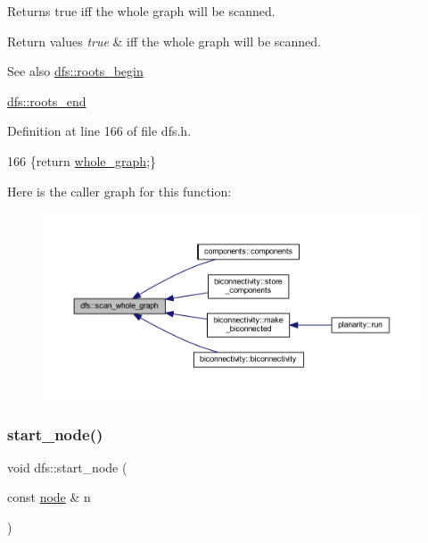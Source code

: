 Returns true iff the whole graph will be scanned. 


\begin{DoxyRetVals}{Return values}
{\em true} & iff the whole graph will be scanned. \\
\hline
\end{DoxyRetVals}
\begin{DoxySeeAlso}{See also}
\mbox{\hyperlink{classdfs_af56fa2b736f0b924dba1257e18ba4b61}{dfs\+::roots\+\_\+begin}} 

\mbox{\hyperlink{classdfs_ae1a61d8c2d8d99059cab410f766ec73f}{dfs\+::roots\+\_\+end}} 
\end{DoxySeeAlso}


Definition at line 166 of file dfs.\+h.


\begin{DoxyCode}
166 \{\textcolor{keywordflow}{return} \mbox{\hyperlink{classdfs_ab8342c80ab208ef0e0d781f0769d0d95}{whole\_graph}};\}
\end{DoxyCode}
Here is the caller graph for this function\+:
\nopagebreak
\begin{figure}[H]
\begin{center}
\leavevmode
\includegraphics[width=350pt]{classdfs_a025ed2d6101a7b9f72578a52b484ef50_icgraph}
\end{center}
\end{figure}
\mbox{\label{classdfs_aad21fd0d3036350fd341f877d5747852}} 
\subsubsection{\texorpdfstring{start\+\_\+node()}{start\_node()}\hspace{0.1cm}{\footnotesize\ttfamily [1/2]}}
{\footnotesize\ttfamily void dfs\+::start\+\_\+node (\begin{DoxyParamCaption}\item[{const \mbox{\hyperlink{classnode}{node}} \&}]{n }\end{DoxyParamCaption})\hspace{0.3cm}{\ttfamily [inline]}}



